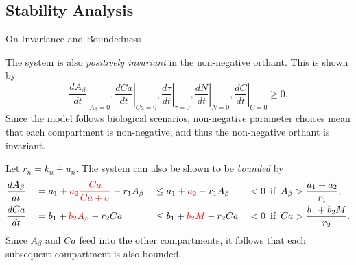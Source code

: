 \documentclass[9pt, dvipsnames,compress,aspectratio=169]{beamer}
\begin{document}
\subsection{Stability Analysis}
\begin{frame}{On Invariance and Boundedness}

    The system is also \textit{positively invariant} in the non-negative orthant. This is shown by 
    \begin{equation*}
        \left. \frac{dA_{\beta}}{dt} \right|_{A_{\beta} = 0}, \left. \frac{dCa}{dt} \right|_{Ca = 0}, \left. \frac{d\tau}{dt} \right|_{\tau = 0}, \left. \frac{dN}{dt} \right|_{N = 0}, \left. \frac{dC}{dt} \right|_{C = 0} \geq 0.
    \end{equation*}
    Since the model follows biological scenarios, non-negative parameter choices mean that each compartment is non-negative, and thus the non-negative orthant is invariant. \bigskip

    Let $r_n = k_n + u_n$. The system can also be shown to be \textit{bounded} by
    \begin{alignat*}{4}
        &\frac{dA_\beta}{dt} &&= a_{1} + \textcolor{red}{a_{2} \frac{Ca}{Ca + \sigma}} - r_{1} A_{\beta} &&\leq a_{1} + \textcolor{red}{a_{2}} - r_{1} A_{\beta} &&<0 \, \text{ if } \, A_{\beta} > \frac{a_{1} + a_{2}}{r_{1}}, \\
        &\frac{dCa}{dt} &&= b_{1} + \textcolor{red}{b_{2} A_{\beta}} - r_{2} Ca &&\leq b_{1} + \textcolor{red}{b_{2} M} - r_{2} Ca &&< 0 \, \text{ if } \, Ca > \frac{b_{1} + b_{2} M}{r_{2}}.
    \end{alignat*}
    Since $A _{\beta}$ and $Ca$ feed into the other compartments, it follows that each subsequent compartment is also bounded.
    
\end{frame}
\end{document}
